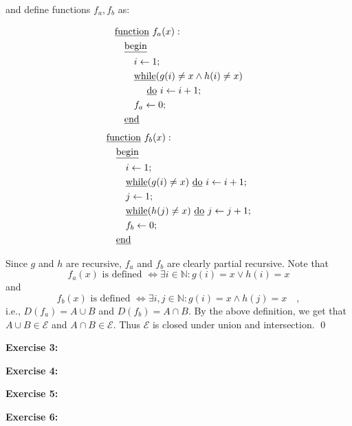 \documentclass [11pt]{article}
\newcommand{\E}{\ensuremath{\mathcal{E}}}
\newcommand{\N}{\ensuremath{\mathbb{N}}}
\begin{document}
\noindent
and define functions $f_a, f_b$ as:
\begin{multicols}{2}
\begin{align*}
& \text{\underline{function} } f_a(x): \\
& \quad \text{\underline{begin}} \\
& \quad \quad i \leftarrow 1; \\
& \quad \quad \text{\underline{while}} (g(i) \neq x \land h(i) \neq x) \\
& \quad \quad \quad \text{ \underline{do} } i \leftarrow i +1; \\
& \quad \quad f_a \leftarrow 0; \\
& \quad \text{\underline{end}}
\end{align*}
\begin{align*}
& \text{\underline{function} } f_b(x): \\
& \quad \text{\underline{begin}} \\
& \quad \quad i \leftarrow 1; \\
& \quad \quad \text{\underline{while}} (g(i) \neq x) \text{ \underline{do} } i \leftarrow i + 1; \\
& \quad \quad j \leftarrow 1; \\
& \quad \quad \text{\underline{while}} (h(j) \neq x) \text{ \underline{do} } j \leftarrow j + 1; \\
& \quad \quad f_b \leftarrow 0; \\
& \quad \text{\underline{end}}
\end{align*}
\end{multicols}
\noindent
Since $g$ and $h$ are recursive, $f_a$ and $f_b$ are clearly partial recursive. 
Note that 
$$
f_a(x) \text{ is defined } \iff \exists i \in \N: g(i) = x \lor h(i) = x
$$
and 
$$
f_b(x) \text{ is defined } \iff \exists i,j \in \N: g(i) = x \land h(j) = x \quad ,
$$
i.e., $D(f_a) = A \cup B$ and $D(f_b) = A \cap B$.
By the above definition, we get that $A\cup B \in \E$ and $A \cap B \in \E$. 
Thus $\E$ is closed under union and intersection. \qed


\bigskip
\noindent
\textbf{Exercise 3:}

\bigskip
\noindent
\textbf{Exercise 4:}

\bigskip
\noindent
\textbf{Exercise 5:}

\bigskip
\noindent
\textbf{Exercise 6:}
\end{document}
